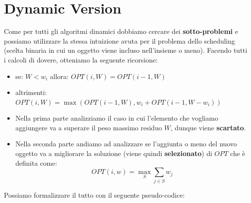 \section{Dynamic Version}

Come per tutti gli algoritmi dinamici dobbiamo cercare dei
\textbf{sotto-problemi} e possiamo utilizzare la stessa intuizione avuta
per il problema dello scheduling (scelta binaria in cui un oggetto viene
incluso nell'insieme o meno). Facendo tutti i calcoli di dovere,
otteniamo la seguente ricorsione:
\begin{myblockquote}
  \begin{itemize}
    \item se: $W < w_i$ allora:
          $OPT(i, W) = OPT(i-1,W)$
    \item altrimenti:
          $OPT(i, W) = \max(OPT(i-1, W), w_i + OPT(i-1, W-w_i))$
  \end{itemize}
\end{myblockquote}

\begin{itemize}

  \item
        Nella prima parte analizziamo il caso in cui l'elemento che vogliamo
        aggiungere va a superare il peso massimo residuo $W$, dunque viene
        \textbf{scartato}.
  \item
        Nella seconda parte andiamo ad analizzare se l'aggiunta o meno del
        nuovo oggetto va a migliorare la soluzione (viene quindi
        \textbf{selezionato}) di $OPT$ che è definita come:
        $$
          OPT(i, w) = \max_{S} \sum_{j \in S} w_j
        $$
\end{itemize}

Possiamo formalizzare il tutto con il seguente pseudo-codice:

